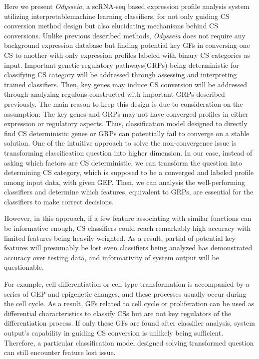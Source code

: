 \documentclass[fleqn,10pt]{wlscirep}
\begin{document}
Here we present \emph{Odysseia}, a scRNA-seq based expression profile analysis system utilizing interpretablemachine learning classifiers, for not only guiding CS conversion method design but also elucidating mechanisms behind CS conversions.
Unlike previous described methods, \emph{Odysseia} does not require any background expression database but finding potential key GFs in conversing one CS to another with only expression profiles labeled with binary CS categories as input.
Important genetic regulatory pathways(GRPs) being deterministic for classifying CS category will be addressed through assessing and interpreting trained classifiers.
Then, key genes may induce CS conversion will be addressed through analyzing regulons constructed with important GRPs described previously.
The main reason to keep this design is due to consideration on the assumption: The key genes and GRPs may not have converged profiles in either expression or regulatory aspects.
Thus, classification model designed to directly find CS deterministic genes or GRPs can potentially fail to converge on a stable solution.
One of the intuitive approach to solve the non-convergence issue is transforming classification question into higher dimension.
In our case, instead of asking which factors are CS deterministic, we can transform the question into determining CS category, which is supposed to be a converged and labeled profile among input data, with given GEP.
Then, we can analysis the well-performing classifiers and determine which features, equivalent to GRPs, are essential for the classifiers to make correct decisions.

However, in this approach, if a few feature associating with similar functions can be informative enough, CS classifiers could reach remarkably high accuracy with limited features being heavily weighted.
As a result, partial of potential key features will presumably be lost even classifiers being analyzed has demonstrated accuracy over testing data, and informativity of system output will be questionable.

For example, cell differentiation or cell type transformation is accompanied by a series of GEP and epigenetic changes, and these processes usually occur during the cell cycle.\cite{dalton_2015, engstrom_2021}
As a result, GFs related to cell cycle or proliferation can be used as differential characteristics to classify CSs but are not key regulators of the differentiation process.
If only these GFs are found after classifier analysis, system output's capability in guiding CS conversion is unlikely being sufficient.
Therefore, a particular classification model designed solving transformed question can still encounter feature lost issue.
\end{document}
